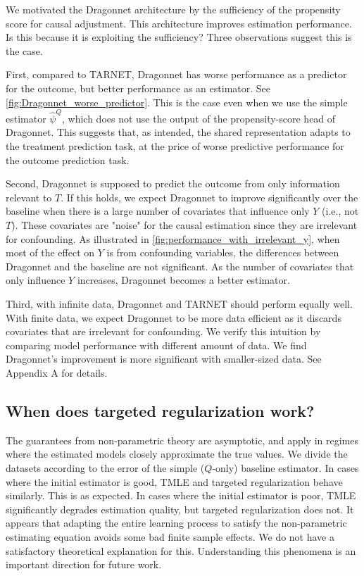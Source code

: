 \documentclass{article}
\begin{document}
We motivated the Dragonnet architecture by the sufficiency of the propensity score for causal adjustment.
This architecture improves estimation performance.
Is this because it is exploiting the sufficiency?
Three observations suggest this is the case.

First, compared to TARNET, Dragonnet has worse performance as a predictor for the outcome, but better performance as an estimator. See \cref{fig:Dragonnet_worse_predictor}. This is the case even when we use the simple estimator $\hat{\psi}^{Q}$, which does not use
the output of the propensity-score head of Dragonnet.
This suggests that, as intended, the shared representation adapts to
the treatment prediction task, at the price of worse predictive performance for the outcome prediction task.

Second, Dragonnet is supposed to predict the outcome from only information relevant to $T$.
If this holds, we expect Dragonnet to improve significantly over the baseline when there is a
large number of covariates that influence only $Y$ (i.e., not $T$).
These covariates are "noise" for the causal estimation since they are irrelevant for confounding.
As illustrated in \cref{fig:performance_with_irrelevant_y},
when most of the effect on $Y$ is from confounding variables, the differences between Dragonnet and the baseline are not significant.
As the number of covariates that only influence $Y$ increases, Dragonnet becomes a better estimator. 

Third, with infinite data, Dragonnet and TARNET should perform equally well. With finite data, we expect Dragonnet to be more data efficient as it discards covariates that are irrelevant for confounding. We verify this intuition by comparing model performance with different amount of data. We find Dragonnet’s improvement is more significant with smaller-sized data. See Appendix A for details. 



\subsection{When does targeted regularization work?}\label{subsec:why-treg}
The guarantees from non-parametric theory are asymptotic,
and apply in regimes where the estimated models closely approximate the true values.
We divide the
datasets according to the error of the simple ($Q$-only) baseline estimator.
In cases where the initial estimator is good, TMLE and targeted regularization behave similarly.
This is as expected.
In cases where the initial estimator is poor, TMLE significantly degrades estimation quality,
but targeted regularization does not.
It appears that adapting the entire learning process to satisfy the non-parametric estimating equation
avoids some bad finite sample effects.
We do not have a satisfactory theoretical explanation for this.
Understanding this phenomena is an important direction for future work.
\end{document}
